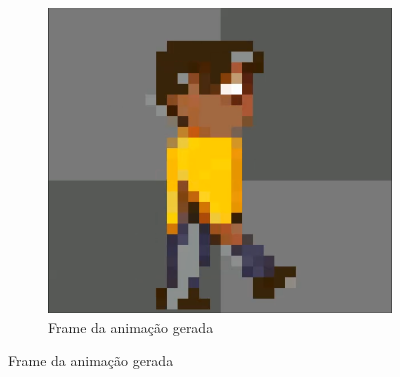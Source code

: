 \begin{figure}[htbp]
\begin{subfigure}{0.35\linewidth}
        \includegraphics[width=1\linewidth]{figs/pixelLab/dia3/print4.PNG}
        \caption{\small Frame da animação gerada}
        \label{fig:pixelLabAnimacao3b}
    \end{subfigure}
\end{figure}

